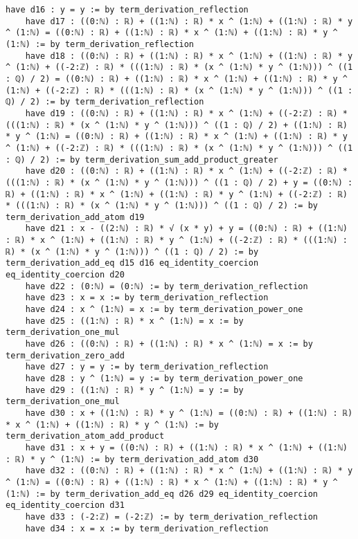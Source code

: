 \documentclass{article}
\begin{document}
\begin{tcolorbox}[colback=white!10, width=\linewidth]
\begin{lstlisting}[language=Lean4]
    have d16 : y = y := by term_derivation_reflection
    have d17 : ((0:ℕ) : ℝ) + ((1:ℕ) : ℝ) * x ^ (1:ℕ) + ((1:ℕ) : ℝ) * y ^ (1:ℕ) = ((0:ℕ) : ℝ) + ((1:ℕ) : ℝ) * x ^ (1:ℕ) + ((1:ℕ) : ℝ) * y ^ (1:ℕ) := by term_derivation_reflection
    have d18 : ((0:ℕ) : ℝ) + ((1:ℕ) : ℝ) * x ^ (1:ℕ) + ((1:ℕ) : ℝ) * y ^ (1:ℕ) + ((-2:ℤ) : ℝ) * (((1:ℕ) : ℝ) * (x ^ (1:ℕ) * y ^ (1:ℕ))) ^ ((1 : ℚ) / 2) = ((0:ℕ) : ℝ) + ((1:ℕ) : ℝ) * x ^ (1:ℕ) + ((1:ℕ) : ℝ) * y ^ (1:ℕ) + ((-2:ℤ) : ℝ) * (((1:ℕ) : ℝ) * (x ^ (1:ℕ) * y ^ (1:ℕ))) ^ ((1 : ℚ) / 2) := by term_derivation_reflection
    have d19 : ((0:ℕ) : ℝ) + ((1:ℕ) : ℝ) * x ^ (1:ℕ) + ((-2:ℤ) : ℝ) * (((1:ℕ) : ℝ) * (x ^ (1:ℕ) * y ^ (1:ℕ))) ^ ((1 : ℚ) / 2) + ((1:ℕ) : ℝ) * y ^ (1:ℕ) = ((0:ℕ) : ℝ) + ((1:ℕ) : ℝ) * x ^ (1:ℕ) + ((1:ℕ) : ℝ) * y ^ (1:ℕ) + ((-2:ℤ) : ℝ) * (((1:ℕ) : ℝ) * (x ^ (1:ℕ) * y ^ (1:ℕ))) ^ ((1 : ℚ) / 2) := by term_derivation_sum_add_product_greater
    have d20 : ((0:ℕ) : ℝ) + ((1:ℕ) : ℝ) * x ^ (1:ℕ) + ((-2:ℤ) : ℝ) * (((1:ℕ) : ℝ) * (x ^ (1:ℕ) * y ^ (1:ℕ))) ^ ((1 : ℚ) / 2) + y = ((0:ℕ) : ℝ) + ((1:ℕ) : ℝ) * x ^ (1:ℕ) + ((1:ℕ) : ℝ) * y ^ (1:ℕ) + ((-2:ℤ) : ℝ) * (((1:ℕ) : ℝ) * (x ^ (1:ℕ) * y ^ (1:ℕ))) ^ ((1 : ℚ) / 2) := by term_derivation_add_atom d19
    have d21 : x - ((2:ℕ) : ℝ) * √ (x * y) + y = ((0:ℕ) : ℝ) + ((1:ℕ) : ℝ) * x ^ (1:ℕ) + ((1:ℕ) : ℝ) * y ^ (1:ℕ) + ((-2:ℤ) : ℝ) * (((1:ℕ) : ℝ) * (x ^ (1:ℕ) * y ^ (1:ℕ))) ^ ((1 : ℚ) / 2) := by term_derivation_add_eq d15 d16 eq_identity_coercion eq_identity_coercion d20
    have d22 : (0:ℕ) = (0:ℕ) := by term_derivation_reflection
    have d23 : x = x := by term_derivation_reflection
    have d24 : x ^ (1:ℕ) = x := by term_derivation_power_one
    have d25 : ((1:ℕ) : ℝ) * x ^ (1:ℕ) = x := by term_derivation_one_mul
    have d26 : ((0:ℕ) : ℝ) + ((1:ℕ) : ℝ) * x ^ (1:ℕ) = x := by term_derivation_zero_add
    have d27 : y = y := by term_derivation_reflection
    have d28 : y ^ (1:ℕ) = y := by term_derivation_power_one
    have d29 : ((1:ℕ) : ℝ) * y ^ (1:ℕ) = y := by term_derivation_one_mul
    have d30 : x + ((1:ℕ) : ℝ) * y ^ (1:ℕ) = ((0:ℕ) : ℝ) + ((1:ℕ) : ℝ) * x ^ (1:ℕ) + ((1:ℕ) : ℝ) * y ^ (1:ℕ) := by term_derivation_atom_add_product
    have d31 : x + y = ((0:ℕ) : ℝ) + ((1:ℕ) : ℝ) * x ^ (1:ℕ) + ((1:ℕ) : ℝ) * y ^ (1:ℕ) := by term_derivation_add_atom d30
    have d32 : ((0:ℕ) : ℝ) + ((1:ℕ) : ℝ) * x ^ (1:ℕ) + ((1:ℕ) : ℝ) * y ^ (1:ℕ) = ((0:ℕ) : ℝ) + ((1:ℕ) : ℝ) * x ^ (1:ℕ) + ((1:ℕ) : ℝ) * y ^ (1:ℕ) := by term_derivation_add_eq d26 d29 eq_identity_coercion eq_identity_coercion d31
    have d33 : (-2:ℤ) = (-2:ℤ) := by term_derivation_reflection
    have d34 : x = x := by term_derivation_reflection

\end{lstlisting}
\end{tcolorbox}
\end{document}
